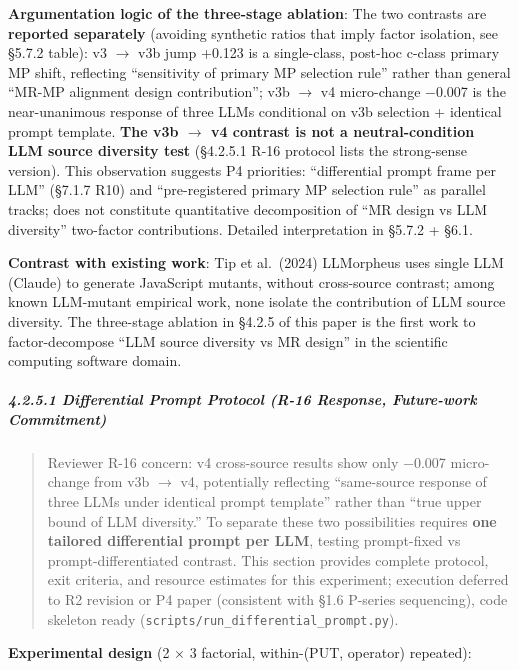 \documentclass[review,12pt,authoryear]{elsarticle}
\begin{document}
\textbf{Argumentation logic of the three-stage ablation}: The two
contrasts are \textbf{reported separately} (avoiding synthetic ratios
that imply factor isolation, see §5.7.2 table): v3 $\to$ v3b jump +0.123 is
a single-class, post-hoc c-class primary MP shift, reflecting
``sensitivity of primary MP selection rule'' rather than general ``MR-MP
alignment design contribution''; v3b $\to$ v4 micro-change −0.007 is the
near-unanimous response of three LLMs conditional on v3b selection +
identical prompt template. \textbf{The v3b $\to$ v4 contrast is not a
neutral-condition LLM source diversity test} (§4.2.5.1 R-16 protocol
lists the strong-sense version). This observation suggests P4
priorities: ``differential prompt frame per LLM'' (§7.1.7 R10) and
``pre-registered primary MP selection rule'' as parallel tracks; does
not constitute quantitative decomposition of ``MR design vs LLM
diversity'' two-factor contributions. Detailed interpretation in §5.7.2
+ §6.1.

\textbf{Contrast with existing work}: Tip et al.~(2024) LLMorpheus uses
single LLM (Claude) to generate JavaScript mutants, without cross-source
contrast; among known LLM-mutant empirical work, none isolate the
contribution of LLM source diversity. The three-stage ablation in §4.2.5
of this paper is the first work to factor-decompose ``LLM source
diversity vs MR design'' in the scientific computing software domain.

\subparagraph{4.2.5.1 Differential Prompt Protocol (R-16 Response,
Future-work
Commitment)}\label{differential-prompt-protocol-r-16-response-future-work-commitment}

\begin{quote}
Reviewer R-16 concern: v4 cross-source results show only −0.007
micro-change from v3b $\to$ v4, potentially reflecting ``same-source
response of three LLMs under identical prompt template'' rather than
``true upper bound of LLM diversity.'' To separate these two
possibilities requires \textbf{one tailored differential prompt per
LLM}, testing prompt-fixed vs prompt-differentiated contrast. This
section provides complete protocol, exit criteria, and resource
estimates for this experiment; execution deferred to R2 revision or P4
paper (consistent with §1.6 P-series sequencing), code skeleton ready
(\texttt{scripts/run\_differential\_prompt.py}).
\end{quote}

\textbf{Experimental design} (2 $\times$ 3 factorial, within-(PUT, operator)
repeated):
\end{document}
